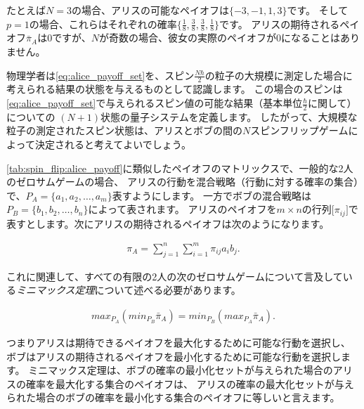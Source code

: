 たとえば$N = 3$の場合、アリスの可能なペイオフは$\{-3,-1,1,3\}$です。
そして$p = 1$の場合、これらはそれぞれの確率$\{ \frac{1}{8},\frac{3}{8},\frac{3}{8},\frac{1}{8} \}$です。
アリスの期待されるペイオフ$\bar{\pi}_A$は$0$ですが、$N$が奇数の場合、彼女の実際のペイオフが$0$になることはありません。

物理学者は\autoref{eq:alice_payoff_set}を、スピン$\frac{N \hbar}{2}$の粒子の大規模に測定した場合に考えられる結果の状態を与えるものとして認識します。
この場合のスピンは\autoref{eq:alice_payoff_set}で与えられるスピン値の可能な結果（基本単位$\frac{\hbar}{2}$に関して）についての
$(N+1)$状態の量子システムを定義します。
したがって、大規模な粒子の測定されたスピン状態は、アリスとボブの間の$N$スピンフリップゲームによって決定されると考えてよいでしょう。

\autoref{tab:spin_flip:alice_payoff}に類似したペイオフのマトリックスで、一般的な2人のゼロサムゲームの場合、
アリスの行動を混合戦略（行動に対する確率の集合）で、$P_A = \{ a_1, a_2, \dots , a_m \}$表すようにします。
一方でボブの混合戦略は$P_B = \{ b_1, b_2, \dots, b_n \}$によって表されます。
アリスのペイオフを$m \times n$の行列$\lbrack\pi_{ij}\rbrack$で表すとします。次にアリスの期待されるペイオフは次のようになります。

\begin{align}
\pi_A = \sum_{j=1}^{n} \sum_{i=1}^{m} \pi_{ij} a_i b_j.
\end{align}

これに関連して、すべての有限の2人の次のゼロサムゲームについて言及している\emph{ミニマックス定理}について述べる必要があります。

\begin{align}
max_{P_A} ( min_{P_B} \bar{\pi}_A ) = min_{P_B} ( max_{P_A} \bar{\pi}_A ).
\end{align}

つまりアリスは期待できるペイオフを最大化するために可能な行動を選択し、
ボブはアリスの期待されるペイオフを最小化するために可能な行動を選択します。
ミニマックス定理は、ボブの確率の最小化セットが与えられた場合のアリスの確率を最大化する集合のペイオフは、
アリスの確率の最大化セットが与えられた場合のボブの確率を最小化する集合のペイオフに等しいと言えます。
